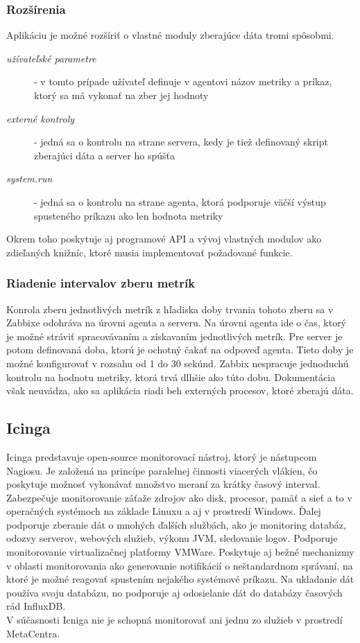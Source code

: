 \documentclass[11pt,final,oneside]{fithesis}
\begin{document}
\subsubsection{Rozšírenia}
Aplikáciu je možné rozšíriť o vlastné moduly zberajúce dáta tromi spôsobmi. \cite{06}
\begin{description}
\item[\emph{užívateľské parametre}] - v tomto prípade užívateľ definuje v agentovi názov metriky a príkaz, ktorý sa má vykonať na zber jej hodnoty
\item[\emph{externé kontroly}] - jedná sa o kontrolu na strane servera, kedy je tiež definovaný skript zberajúci dáta a server ho spúšťa
\item[\emph{system.run}] - jedná sa o kontrolu na strane agenta, ktorá podporuje väčší výstup spusteného príkazu ako len hodnota metriky
\end{description}
Okrem toho poskytuje aj programové API a vývoj vlastných modulov ako zdieľaných knižníc, ktoré musia implementovať požadované funkcie.

\subsubsection{Riadenie intervalov zberu metrík}
Konrola zberu jednotlivých metrík z hľadiska doby trvania tohoto zberu sa v Zabbixe odohráva na úrovni agenta a serveru. Na úrovni agenta ide o čas, ktorý je možné stráviť spracovávaním a získavaním
jednotlivých metrík. Pre server je potom definovaná doba, ktorú je ochotný čakať na odpoveď agenta. Tieto doby je možné konfigurovať v rozsahu od 1 do 30 sekúnd.
\cite{20}
\cite{05}
Zabbix nespracuje jednoduchú kontrolu na hodnotu metriky, ktorá trvá dlhšie ako túto dobu.
\cite{04}
Dokumentácia však neuvádza, ako sa aplikácia riadi beh externých procesov, ktoré zberajú dáta.

\subsection{Icinga}
Icinga predstavuje open-source monitorovací nástroj, ktorý je nástupcom Nagiosu. Je založená na princípe paralelnej činnosti viacerých vlákien, čo poskytuje možnosť vykonávať množstvo meraní
za krátky časový interval. Zabezpečuje monitorovanie záťaže zdrojov ako disk, procesor, pamäť a sieť a to v operačných systémoch na základe Linuxu a aj v prostredí Windows. Ďalej podporuje zberanie
dát o mnohých ďalších službách, ako je monitoring databáz, odozvy serverov, webových služieb, výkonu JVM, sledovanie logov. Podporuje monitorovanie virtualizačnej platformy VMWare. 
Poskytuje aj bežné mechanizmy v oblasti monitorovania ako generovanie notifikácií o neštandardnom správaní, na ktoré je možné reagovať spustením nejakého systémové príkazu. Na ukladanie dát 
používa svoju databázu, no podporuje aj odosielanie dát do databázy časových rád InfluxDB.
\\V súčasnosti Icniga nie je schopná monitorovať ani jednu zo služieb v prostredí MetaCentra.
\end{document}
